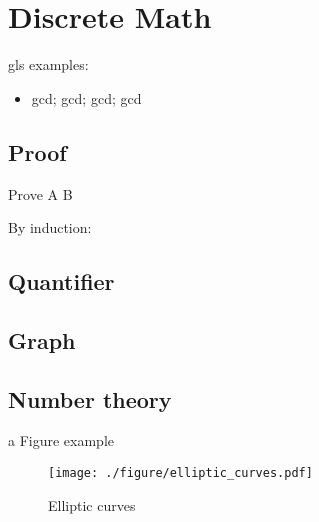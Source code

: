 \chapter{Discrete Math}\label{chp:discrete_math}

\minitoc

gls examples:
\begin{itemize}
	\item \Gls{gcd}; \acrlong{gcd}; \acrshort{gcd}; \acrfull{gcd}
\end{itemize}

\section{Proof}
\begin{lemma}
\end{lemma}
\begin{claim}
\end{claim}
\begin{theorem}
\end{theorem}
\begin{example}
\end{example}
\begin{fact}
\end{fact}
\begin{remark}
\end{remark}
\begin{exercise}
	Prove A \iff B
\end{exercise}
\begin{solution}
	By induction:
\end{solution}

\lipsum %

\section{Quantifier}
\lipsum %

\section{Graph}
\cite{babaiGraphIsomorphismQuasipolynomial2016}

\section{Number theory}
a Figure example
\begin{figure}[!ht]
	\centering
	\texttt{[image: ./figure/elliptic\_curves.pdf]}
	\caption{Elliptic curves \cite{childsUniversalComputationQuantum2009} }
\end{figure}


